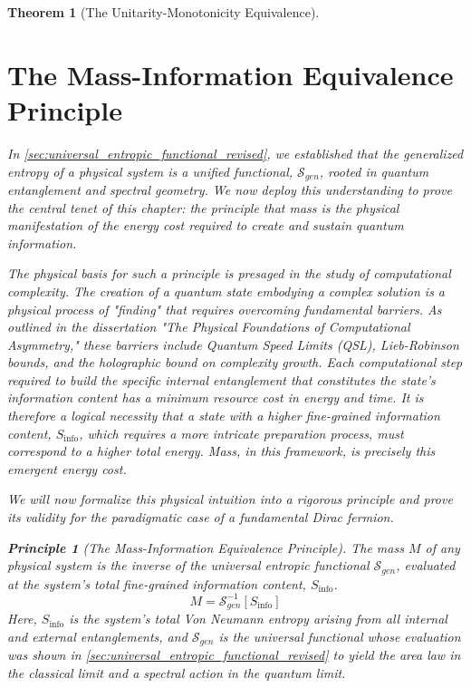 \documentclass[11pt, letterpaper]{report}
\theoremstyle{plain} %
\newtheorem{theorem}{Theorem}[chapter]
\theoremstyle{definition} %
\newtheorem{principle}{Principle}[chapter]
\theoremstyle{remark} %
\begin{document}
\begin{theorem}[The Unitarity-Monotonicity Equivalence]
\section{The Mass-Information Equivalence Principle}
\label{sec:mass_info_equivalence_principle_revised}

In \cref{sec:universal_entropic_functional_revised}, we established that the generalized entropy of a physical system is a unified functional, $\mathcal{S}_{gen}$, rooted in quantum entanglement and spectral geometry. We now deploy this understanding to prove the central tenet of this chapter: the principle that mass is the physical manifestation of the energy cost required to create and sustain quantum information.

The physical basis for such a principle is presaged in the study of computational complexity. The creation of a quantum state embodying a complex solution is a physical process of "finding" that requires overcoming fundamental barriers. As outlined in the dissertation "The Physical Foundations of Computational Asymmetry," these barriers include Quantum Speed Limits (QSL), Lieb-Robinson bounds, and the holographic bound on complexity growth. Each computational step required to build the specific internal entanglement that constitutes the state's information content has a minimum resource cost in energy and time. It is therefore a logical necessity that a state with a higher fine-grained information content, $S_{\text{info}}$, which requires a more intricate preparation process, must correspond to a higher total energy. Mass, in this framework, is precisely this emergent energy cost.

We will now formalize this physical intuition into a rigorous principle and prove its validity for the paradigmatic case of a fundamental Dirac fermion.

\begin{principle}[The Mass-Information Equivalence Principle]
\label{principle:mass_info_equivalence}
The mass $M$ of any physical system is the inverse of the universal entropic functional $\mathcal{S}_{gen}$, evaluated at the system's total fine-grained information content, $S_{\text{info}}$.
\begin{equation}
    M = \mathcal{S}_{gen}^{-1}[S_{\text{info}}]
\end{equation}
Here, $S_{\text{info}}$ is the system's total Von Neumann entropy arising from all internal and external entanglements, and $\mathcal{S}_{gen}$ is the universal functional whose evaluation was shown in \cref{sec:universal_entropic_functional_revised} to yield the area law in the classical limit and a spectral action in the quantum limit.
\end{principle}


\end{theorem}
\end{document}
